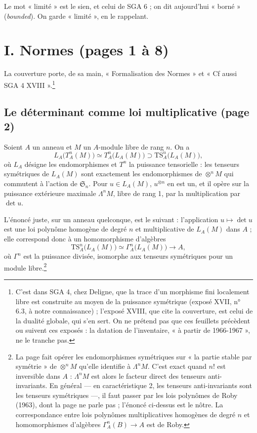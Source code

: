 \documentclass[11pt,a4paper]{article}
\begin{document}
Le mot « limité » est le sien, et celui de SGA 6 ; on dit aujourd'hui
« borné » (\emph{bounded}). On garde « limité », en le rappelant.

\section*{I. Normes (pages 1 à 8)}

La couverture porte, de sa main, « Formalisation des Normes » et
« Cf aussi SGA 4 XVIII ».\footnote{C'est dans SGA 4, chez Deligne, que la
trace d'un morphisme fini localement libre est construite au moyen de la
puissance symétrique (exposé XVII, n° 6.3, à notre connaissance) ;
l'exposé XVIII, que cite la couverture, est celui de la dualité globale,
qui s'en sert. On ne prétend pas que ces feuillets précèdent ou suivent ces
exposés : la datation de l'inventaire, « à partir de 1966-1967 », ne le
tranche pas.}

\subsection*{Le déterminant comme loi multiplicative (page 2)}

Soient $A$ un anneau et $M$ un $A$-module libre de rang $n$. On a
\[
  L_A\bigl(T^{n}_{A}(M)\bigr) \simeq T^{n}_{A}\bigl(L_A(M)\bigr) \supset
  \mathrm{TS}^{n}_{A}\bigl(L_A(M)\bigr),
\]
où $L_A$ désigne les endomorphismes et $T^{n}$ la puissance tensorielle :
les tenseurs symétriques de $L_A(M)$ sont exactement les endomorphismes de
$\otimes^{n} M$ qui commutent à l'action de $\mathfrak{S}_n$. Pour
$u \in L_A(M)$, $u^{\otimes n}$ en est un, et il opère sur la puissance
extérieure maximale $\Lambda^{n} M$, libre de rang 1, par la multiplication
par $\det u$.

L'énoncé juste, sur un anneau quelconque, est le suivant : l'application
$u \mapsto \det u$ est une loi polynôme homogène de degré $n$ et
multiplicative de $L_A(M)$ dans $A$ ; elle correspond donc à un
homomorphisme d'algèbres
\[
  \mathrm{TS}^{n}_{A}\bigl(L_A(M)\bigr) \simeq \Gamma^{n}_{A}\bigl(L_A(M)\bigr)
  \longrightarrow A,
\]
où $\Gamma^{n}$ est la puissance divisée, isomorphe aux tenseurs
symétriques pour un module libre.\footnote{La page fait opérer les
endomorphismes symétriques sur « la partie stable par symétrie » de
$\otimes^{n} M$ qu'elle identifie à $\Lambda^{n} M$. C'est exact quand $n!$
est inversible dans $A$ : $\Lambda^{n} M$ est alors le facteur direct des
tenseurs anti-invariants. En général --- en caractéristique 2, les tenseurs
anti-invariants sont les tenseurs symétriques ---, il faut passer par les
lois polynômes de Roby (1963), dont la page ne parle pas ; l'énoncé ci-dessus
est le nôtre. La correspondance entre lois polynômes multiplicatives
homogènes de degré $n$ et homomorphismes d'algèbres
$\Gamma^{n}_{A}(B) \to A$ est de Roby.}
\end{document}

